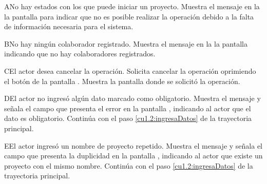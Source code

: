 	 \begin{UCtrayectoriaA}{A}{No hay estados con los que puede iniciar un proyecto.}
	    \UCpaso[\UCsist] Muestra el mensaje  en la la pantalla  para indicar que no es posible realizar la operación debido a la falta de información necesaria para el sistema.
	 \end{UCtrayectoriaA} 
	 \begin{UCtrayectoriaA}{B}{No hay ningún colaborador registrado.}
	    \UCpaso[\UCsist] Muestra el mensaje  en la la pantalla  indicando que no hay colaboradores registrados.
	 \end{UCtrayectoriaA} 
	 \begin{UCtrayectoriaA}{C}{El actor desea cancelar la operación.}
	    \UCpaso[\UCactor] Solicita cancelar la operación oprimiendo el botón  de la pantalla .
	    \UCpaso[\UCsist] Muestra la pantalla donde se solicitó la operación.
	 \end{UCtrayectoriaA} 
	 \begin{UCtrayectoriaA}{D}{El actor no ingresó algún dato marcado como obligatorio.}
	    \UCpaso[\UCsist] Muestra el mensaje  y señala el campo que presenta el error en la pantalla 
		    , indicando al actor que el dato es obligatorio.
	    \UCpaso[] Continúa con el paso \ref{cu1.2:ingresaDatos} de la trayectoria principal.
	 \end{UCtrayectoriaA}
	 \begin{UCtrayectoriaA}{E}{El actor ingresó un nombre de proyecto repetido.}
	    \UCpaso[\UCsist] Muestra el mensaje  y señala el campo que presenta la duplicidad en la pantalla 
		    , indicando al actor que existe un proyecto con el mismo nombre.
	    \UCpaso[] Continúa con el paso \ref{cu1.2:ingresaDatos} de la trayectoria principal.
	 \end{UCtrayectoriaA}
